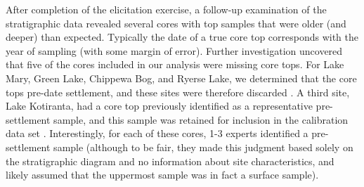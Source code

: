 \documentclass[12pt]{article}
\begin{document}

After completion of the elicitation exercise, a follow-up examination
of the stratigraphic data revealed several cores with top samples that
were older (and deeper) than expected. Typically the date of a true
core top corresponds with the year of sampling (with some margin of
error). Further investigation uncovered that five of the cores
included in our analysis were missing core tops. For Lake Mary, Green
Lake, Chippewa Bog, and Ryerse Lake, we determined that the core tops
pre-date settlement, and these sites were therefore discarded
\citep{webb1971late, lawrenz1975}. A third site, Lake Kotiranta, had a
core top previously identified as a representative pre-settlement
sample, and this sample was retained for inclusion in the calibration
data set \citep{wright1969}. Interestingly, for each of these cores,
1-3 experts identified a pre-settlement sample (although to be fair,
they made this judgment based solely on the stratigraphic diagram and
no information about site characteristics, and likely assumed that the
uppermost sample was in fact a surface sample).


\end{document}

